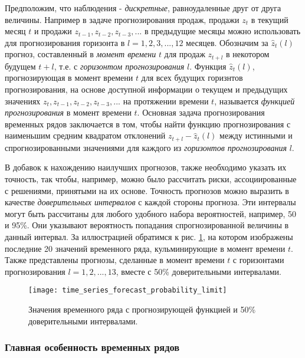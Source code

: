 Предположим, что наблюдения - \textit{дискретные}, равноудаленные друг от друга величины. 
Например в задаче прогнозирования продаж, продажи $z_t$ в текущий месяц $t$ и продажи 
$z_{t-1}, z_{t-2}, z_{t-3}, ...$ в предыдущие месяцы можно использовать для 
прогнозирования горизонта в $l = 1, 2, 3, ..., 12$ месяцев. Обозначим за $\hat{z}_t (l)$ 
прогноз, составленный в \textit{момент времени} $t$ для продаж $z_{t+l}$ в некотором будущем $t+l$, т.е.
с \textit{горизонтом прогнозирования} $l$. Функция $\hat{z}_t (l)$, прогнозирующая в момент времени 
$t$ для всех будущих горизнтов прогнозирования, на основе доступной информации о 
текущем и предыдущих значениях $z_t, z_{t-1}, z_{t-2}, z_{t-3}, ...$ на протяжении времени $t$, 
называется \textit{функцией прогнозирования} в момент времени $t$. Основная задача 
прогнозирования временных рядов заключается в том, чтобы найти функцию прогнозирования с 
наименьшим средним квадратом отклонений $z_{t+l} - \hat{z}_t (l)$ между истинными и 
спрогнозированными значениями для каждого из \textit{горизонтов прогнозирования} $l$. 

В добавок к нахождению наилучших прогнозов, также необходимо указать их точность, так 
чтобы, например, можно было рассчитать риски, ассоциированные с решениями, принятыми на 
их основе. Точность прогнозов можно выразить в качестве \textit{доверительных интервалов} 
с каждой стороны прогноза. Эти интервалы могут быть рассчитаны для любого удобного набора 
вероятностей, например, 50 и 95\%. Они указывают вероятность попадания спрогнозированной 
величины в данный интервал. За иллюстрацией обратимся к рис. \ref{fig:time_series_forecast_probability_limit}, 
на котором изображены последние 20 значений временного ряда, кульминирующие в момент времени $t$. 
Также представлены прогнозы, сделанные в момент времени $t$ с горизонтами прогнозирования 
$l = 1, 2, ..., 13$, вместе с 50\% доверительными интервалами.

\begin{figure}[h!]
    \centering
    \texttt{[image: time\_series\_forecast\_probability\_limit]}
    \caption{Значения временного ряда с прогнозирующей функцией и 50\% доверительными интервалами.}
    \label{fig:time_series_forecast_probability_limit}
\end{figure}

\subsubsection{Главная особенность временных рядов}

